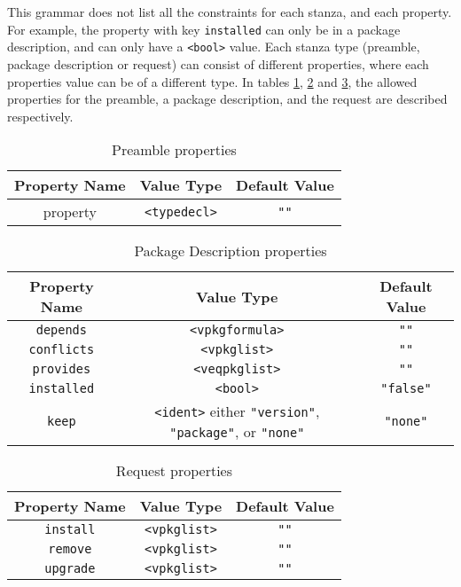 This grammar does not list all the constraints for each stanza, and each property.
For example, the property with key \verb+installed+ can only be in a package description, and can only have a \verb+<bool>+ value.
Each stanza type (preamble, package description or request) can consist of different properties, where each properties value can be of a different type.
In tables \ref{formal.cudfpremableprops}, \ref{formal.cudfpdprops} and \ref{formal.cudfrequestprops}, 
the allowed properties for the preamble, a package description, and the request are described respectively.

\begin{table}[h]
\begin{tabular}{|c|c|c|}
\hline
Property Name & Value Type & Default Value \\ \hline
property & \verb+<typedecl>+ & \verb+""+ \\\hline
\end{tabular}
\caption{Preamble properties}
\label{formal.cudfpremableprops}
\end{table}

\begin{table}[h]
\begin{tabular}{|c|c|c|}
\hline
Property Name & Value Type & Default Value \\ \hline
\texttt{depends} & \texttt{<vpkgformula>} & \verb+""+ \\
\texttt{conflicts} & \texttt{<vpkglist>} & \verb+""+ \\ 
\texttt{provides} & \texttt{<veqpkglist>} & \verb+""+ \\ 
\texttt{installed} & \texttt{<bool>} & \verb+"false"+ \\ 
\texttt{keep} & \texttt{<ident>} either \texttt{"version"}, \texttt{"package"}, or \texttt{"none"} & \texttt{"none"} \\ \hline
\end{tabular}
\caption{Package Description properties}
\label{formal.cudfpdprops}
\end{table}

\begin{table}[h]
\begin{tabular}{|c|c|c|}
\hline
Property Name & Value Type & Default Value \\ \hline
\texttt{install} & \verb+<vpkglist>+ & \verb+""+ \\ 
\texttt{remove} & \verb+<vpkglist>+ & \verb+""+ \\ 
\texttt{upgrade} & \verb+<vpkglist>+ & \verb+""+ \\ \hline
\end{tabular}
\caption{Request properties}
\label{formal.cudfrequestprops}
\end{table}

